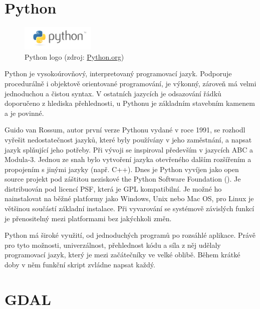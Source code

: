 
\section{Python}

\begin{figure}[H]
    \centering
      \includegraphics[width=100pt]{./pictures/python-logo-master-v3-TM.png}
      \caption[Python logo]{Python logo 
      (zdroj: \href{https://www.python.org/static/community_logos/python-logo-master-v3-TM.png}{Python.org})}
      \label{fig:python}
  \end{figure}
  
Python je vysokoúrovňový, interpretovaný programovací jazyk. Podporuje procedurálně i objektově orientované programování, je výkonný, zároveň má velmi jednoduchou a čistou syntax. V ostatních jazycích je odsazování řádků doporučeno z hlediska přehlednosti, u Pythonu je základním stavebním kamenem a je povinné. 

Guido van Rossum, autor první verze Pythonu vydané v roce 1991, se rozhodl vyřešit nedostatečnost jazyků, které byly používány v jeho zaměstnání, a napsat jazyk splňující jeho potřeby. Při vývoji se inspiroval především v jazycích ABC a Modula-3. Jednou ze snah bylo vytvoření jazyka otevřeného dalším rozšířením a propojením s jinými jazyky (např. C++). Dnes je Python vyvíjen jako open source projekt pod záštitou neziskové the Python Software Foundation (). Je distribuován pod licencí PSF, která je GPL kompatibilní. Je možné ho nainstalovat na běžné platformy jako Windows, Unix nebo Mac OS, pro Linux je většinou součástí základní instalace. Při vyvarování se systémově závislých funkcí je přenositelný mezi platformami bez jakýchkoli změn.

Python má široké využití, od jednoduchých programů po rozsáhlé aplikace. Právě pro tyto možnosti, univerzálnost, přehlednost kódu a síla z něj udělaly programovací jazyk, který je mezi začátečníky ve velké oblibě. Během krátké doby v něm funkční skript zvládne napsat každý. 
  
  
\section{GDAL}  

